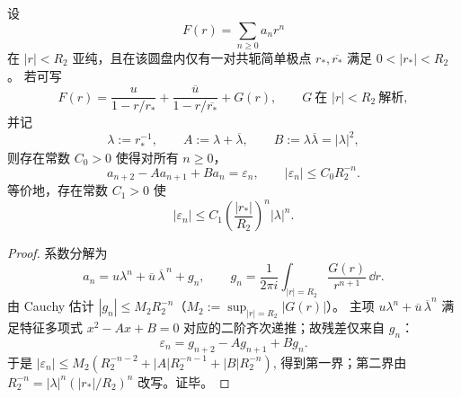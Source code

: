 \begin{theorem}[双共轭主极点的局部二阶递推与指数余项]\label{thm:xi-abel-local-ar2-dominant-conjugate-poles}
设
\[
F(r)=\sum_{n\ge 0}a_n r^n
\]
在 \(|r|<R_2\) 亚纯，且在该圆盘内仅有一对共轭简单极点
\(
r_\ast,\overline{r_\ast}
\)
满足 \(0<|r_\ast|<R_2\)。
若可写
\[
F(r)=\frac{u}{1-r/r_\ast}+\frac{\overline u}{1-r/\overline{r_\ast}}+G(r),
\qquad
G\ \text{在 }|r|<R_2\ \text{解析},
\]
并记
\[
\lambda:=r_\ast^{-1},\qquad
A:=\lambda+\overline\lambda,\qquad
B:=\lambda\overline\lambda=|\lambda|^2,
\]
则存在常数 \(C_0>0\) 使得对所有 \(n\ge 0\)，
\[
a_{n+2}-A a_{n+1}+B a_n=\varepsilon_n,\qquad
|\varepsilon_n|\le C_0R_2^{-n}.
\]
等价地，存在常数 \(C_1>0\) 使
\[
|\varepsilon_n|\le C_1\left(\frac{|r_\ast|}{R_2}\right)^n|\lambda|^n.
\]
\end{theorem}
\begin{proof}
系数分解为
\[
a_n=u\lambda^n+\overline u\,\overline\lambda^{\,n}+g_n,\qquad
g_n=\frac{1}{2\pi i}\int_{|r|=R_2}\frac{G(r)}{r^{n+1}}\,\dd r.
\]
由 Cauchy 估计 \(|g_n|\le M_2R_2^{-n}\)（\(M_2:=\sup_{|r|=R_2}|G(r)|\)）。
主项 \(u\lambda^n+\overline u\,\overline\lambda^n\) 满足特征多项式
\(
x^2-Ax+B=0
\)
对应的二阶齐次递推；故残差仅来自 \(g_n\)：
\[
\varepsilon_n=g_{n+2}-Ag_{n+1}+Bg_n.
\]
于是
\(
|\varepsilon_n|\le M_2(R_2^{-n-2}+|A|R_2^{-n-1}+|B|R_2^{-n})
\),
得到第一界；第二界由 \(R_2^{-n}=|\lambda|^n(|r_\ast|/R_2)^n\) 改写。证毕。
\end{proof}

